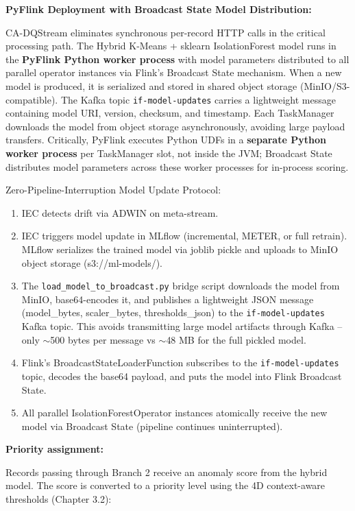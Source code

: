 \textbf{PyFlink Deployment with Broadcast State Model Distribution:}

CA-DQStream eliminates synchronous per-record HTTP calls in the critical processing path. The Hybrid K-Means + sklearn IsolationForest model runs in the \textbf{PyFlink Python worker process} with model parameters distributed to all parallel operator instances via Flink's Broadcast State mechanism. When a new model is produced, it is serialized and stored in shared object storage (MinIO/S3-compatible). The Kafka topic \texttt{if-model-updates} carries a lightweight message containing model URI, version, checksum, and timestamp. Each TaskManager downloads the model from object storage asynchronously, avoiding large payload transfers. Critically, PyFlink executes Python UDFs in a \textbf{separate Python worker process} per TaskManager slot, not inside the JVM; Broadcast State distributes model parameters across these worker processes for in-process scoring.

Zero-Pipeline-Interruption Model Update Protocol:
\begin{enumerate}
    \item IEC detects drift via ADWIN on meta-stream.
    \item IEC triggers model update in MLflow (incremental, METER, or full retrain). MLflow serializes the trained model via joblib pickle and uploads to MinIO object storage (s3://ml-models/).
    \item The \texttt{load\_model\_to\_broadcast.py} bridge script downloads the model from MinIO, base64-encodes it, and publishes a lightweight JSON message (model\_bytes, scaler\_bytes, thresholds\_json) to the \texttt{if-model-updates} Kafka topic. This avoids transmitting large model artifacts through Kafka -- only $\sim$500 bytes per message vs $\sim$48 MB for the full pickled model.
    \item Flink's BroadcastStateLoaderFunction subscribes to the \texttt{if-model-updates} topic, decodes the base64 payload, and puts the model into Flink Broadcast State.
    \item All parallel IsolationForestOperator instances atomically receive the new model via Broadcast State (pipeline continues uninterrupted).
\end{enumerate}

\textbf{Priority assignment:}

Records passing through Branch 2 receive an anomaly score from the hybrid model. The score is converted to a priority level using the 4D context-aware thresholds (Chapter 3.2):

